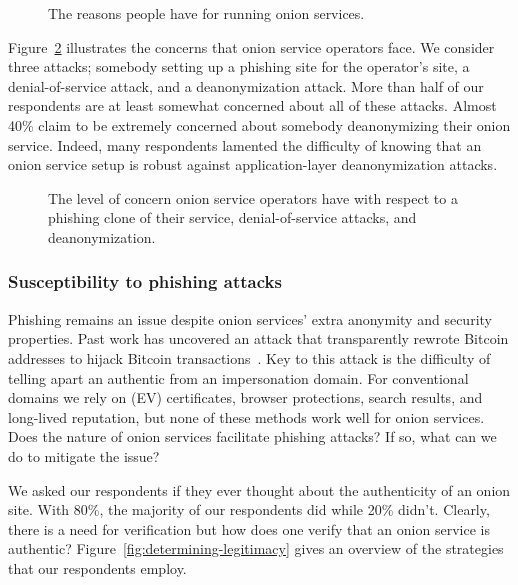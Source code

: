 \begin{figure}[t]
    \centering
    
    \caption{The reasons people have for running onion services.}
    \label{fig:onion-operation-reasons}
\end{figure}

Figure~\ref{fig:onion-operation-concerns} illustrates the concerns that onion
service operators face.  We consider three attacks; \first somebody setting up a
phishing site for the operator's site, \second a denial-of-service attack, and
\third a deanonymization attack.  More than half of our respondents are at least
somewhat concerned about all of these attacks.  Almost 40\% claim to be
extremely concerned about somebody deanonymizing their onion service.  Indeed,
many respondents lamented the difficulty of knowing that an onion service setup
is robust against application-layer deanonymization attacks.

\begin{figure}[t]
    \centering
    
    \caption{The level of concern onion service operators have with respect to a
    phishing clone of their service, denial-of-service attacks, and
    deanonymization.}
    \label{fig:onion-operation-concerns}
\end{figure}

\subsubsection{Susceptibility to phishing attacks}

Phishing remains an issue despite onion services' extra anonymity and security
properties.  Past work has uncovered an attack that transparently rewrote
Bitcoin addresses to hijack Bitcoin
transactions~\cite{Winter2016a,Nurmi2015a,Monteiro2016a}.  Key to this attack is
the difficulty of telling apart an authentic from an impersonation domain.  For
conventional domains we rely on (EV) certificates, browser protections, search
results, and long-lived reputation, but none of these methods work well for
onion services.  Does the nature of onion services facilitate phishing attacks?
If so, what can we do to mitigate the issue?

We asked our respondents if they ever thought about the authenticity of an onion
site.  With 80\%, the majority of our respondents did while 20\% didn't.
Clearly, there is a need for verification but how does one verify that an onion
service is authentic?  Figure~\ref{fig:determining-legitimacy} gives an overview
of the strategies that our respondents employ.

